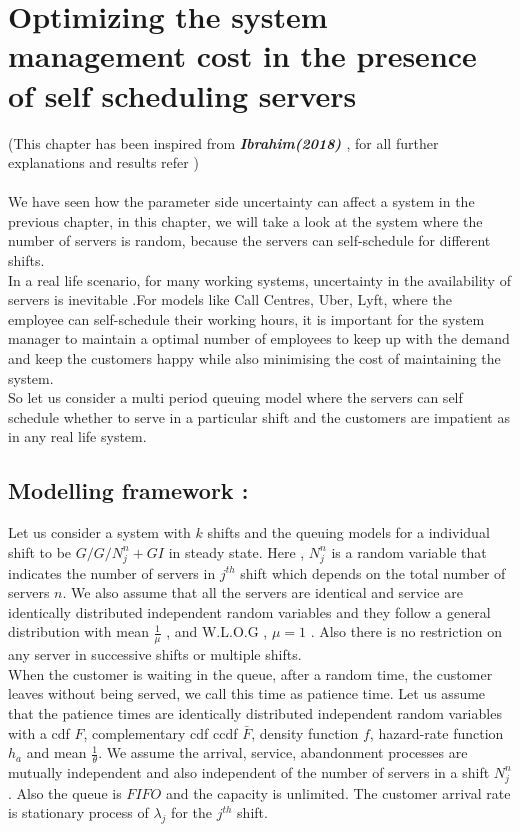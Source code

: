 \chapter{Optimizing the system management cost in the presence of self scheduling servers}
(This chapter has been inspired from \textbf{\textit{Ibrahim(2018)} \cite{ibrahim}} , for all further explanations and results refer \cite{ibrahim})
\\
\\ We have seen how the parameter side uncertainty can affect a system in the previous chapter, in this chapter, we will take a look at the system where the number of servers is random, because the servers can self-schedule for different shifts.
\\In a real life scenario, for many working systems, uncertainty in the availability of servers is inevitable .For models like Call Centres, Uber, Lyft, where the employee can self-schedule their working hours, it is important for the system manager to maintain a optimal number of employees to keep up with the demand and keep the customers happy while also minimising the cost of maintaining the system.
\\ So let us consider a multi period queuing model where the servers can self schedule whether to serve in a particular shift and the customers are impatient as in any real life system. 
\section{Modelling framework :}
Let us consider a system with $k$ shifts and the queuing models for a individual shift to be 
$G/G/N_{j}^{n} +GI$ in steady state. Here , $N_{j}^{n}$ is a random variable that indicates the number of servers in $j^{th}$ shift which depends on the total number of servers $n$. We also assume that all the servers are identical and service are identically distributed independent random variables and they follow a general distribution with mean $\frac{1}{\mu}$ , and W.L.O.G , $\mu=1$ . Also there is no restriction on any server in successive shifts or multiple shifts.
\\ When the customer is waiting in the queue, after a random time, the customer leaves without being served, we call this time as patience time. Let us assume that the patience times are identically distributed independent random variables with a cdf $F$, complementary cdf ccdf $\bar{F}$, density function $f$, hazard-rate function $h_{a}$ and mean $\frac{1}{\theta}$. We assume the arrival, service, abandonment processes are mutually independent and also independent of the number of servers in a shift $N_{j}^{n}$. Also the queue is $FIFO$ and the capacity is unlimited. The customer arrival rate is stationary process of $\lambda_j$ for the $j^{th}$ shift.
